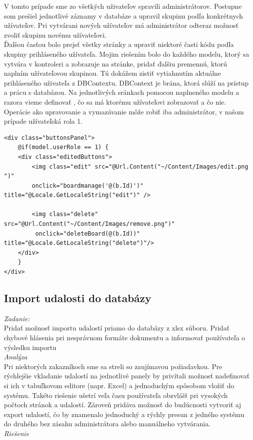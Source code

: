 \documentclass[11pt, oneside]{report}
\begin{document}
V tomto prípade sme zo všetkých uživateľov spravili administrátorov. Postupne som prešiel jednotlivé záznamy v databáze a upravil skupinu podľa konkrétnych užívateľov. Pri vytvárani nových užívateľov má administrátor odteraz možnosť zvoliť skupinu novému užívateľovi.\\ Ďalšou časťou bolo prejsť všetky stránky a upraviť  niektoré časti kódu podľa skupiny prihláseného užívateľa. Mojim riešením bolo do každého modelu, ktorý sa vytvára v kontroleri a zobrazuje na stránke, pridať ďalšiu premennú, ktorú naplním užívateľovou skupinou. Tú dokážem zistiť vytiahnutím aktuálne prihláseného uživateľa z DBContextu. DBContext je brána, ktorá slúží na prístup a prácu s databázou. Na jednotlivých sránkach pomocou naplneného modelu  a razora vieme definovať , čo sa má ktorému užívateľovi zobrazovať a čo nie. Operácie ako upravovanie a vymazávanie môže robiť iba administrátor, v našom prípade užívateľská rola 1. 
\lstset{language=HTML5}
\begin{lstlisting}[caption=Zobrazenie operácii pre administrátora,captionpos=b]
<div class="buttonsPanel">
    @if(model.userRole == 1) {
    <div class="editedButtons">
        <img class="edit" src="@Url.Content("~/Content/Images/edit.png ")"
        onclick="boardmanage('@(b.Id)')" title="@Locale.GetLocaleString("edit")" />
        
        <img class="delete" src="@Url.Content("~/Content/Images/remove.png")"
         onclick="deleteBoard(@(b.Id))" title="@Locale.GetLocaleString("delete")"/>
    </div>
    }
</div>
\end{lstlisting}
\subsection*{Import udalosti do databázy}
\textit{Zadanie:}\\
Pridať možnosť importu udalostí priamo do databázy z xlsx súboru. Pridať  chybové hlásenia pri  nesprávnom formáte dokumentu a informovať používateľa o výsledku importu
\\\textit{Analýza}\\
Pri niektorých zakazníkoch sme sa streli so zaujímavou požiadavkou. Pre rýchlejšie vkladanie  udalostí na jednotlivé panely by privítali možnosť nadefinovať si ich   v tabuľkovom editore (napr. Excel) a jednoduchým spôsobom vložiť do systému. Takéto riešenie ušetrí veľa času používateľa obzvlášť pri vysokých počtoch stránok a udalostí. Zároveň pridáva možnosť  do budúcnosti vytvoriť aj export udalostí, čo by znamenalo  jednoduchý a rýchly presun z jedného systému do druhého bez zásahu administrátora alebo manuálneho vytvárania.
\\\textit{Riešenie}\\
\end{document}
